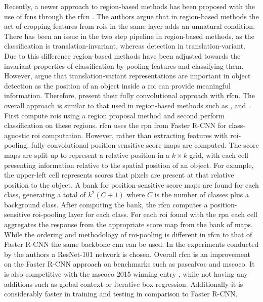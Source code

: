 \documentclass[a4paper,twoside]{article}
\begin{document}
Recently, a newer approach to region-based methods has been proposed with the use of \glspl{fcn} through the \gls{rfcn} \cite{rfcn}. The authors argue that in region-based methods the act of cropping features from \glspl{roi} in the same layer adds an unnatural condition. There has been an issue in the two step pipeline in region-based methods, as the classification is translation-invariant, whereas detection in translation-variant. Due to this difference region-based methods have been adjusted towards the invariant properties of classification by pooling features and classifying them. However, \cite{rfcn} argue that translation-variant representations are important in object detection as the position of an object inside a \gls{roi} can provide meaningful information. Therefore, \cite{rfcn} present their fully convolutional approach with \gls{rfcn}. The overall approach is similar to that used in region-based methods such as \cite{rcnn}, \cite{fastrcnn} and \cite{fasterrcnn}. First compute \glspl{roi} using a region proposal method and second perform classification on these regions. \gls{rfcn} uses the \gls{rpn} from Faster R-CNN \cite{fasterrcnn} for class-agnostic \gls{roi} computation. However, rather than extracting features with \gls{roi}-pooling, fully convolutional position-sensitive score maps are computed. The score maps are split up to represent a relative position in a $k\times k$ grid, with each cell presenting information relative to the spatial position of an object. For example, the upper-left cell represents scores that pixels are present at that relative position to the object. A bank for position-sensitive score maps are found for each class, generating a total of $k^2(C+1)$ where $C$ is the number of classes plus a background class. After computing the bank, the \gls{rfcn} computes a position-sensitive \gls{roi}-pooling layer for each class. For each \gls{roi} found with the \gls{rpn} each cell aggregates the response from the appropriate score map from the bank of maps. While the ordering and methodology of \gls{roi}-pooling is different in \gls{rfcn} to that of Faster R-CNN the same backbone \gls{cnn} can be used. In the experiments conducted by the authors a ResNet-101 network is chosen. Overall \gls{rfcn} is an improvement on the Faster R-CNN approach on benchmarks such as \gls{pascalvoc} and \gls{mscoco}. It is also competitive with the \gls{mscoco} 2015 winning entry \cite{deepres}, while not having any additions such as global context or iterative box regression. Additionally it is considerably faster in training and testing in comparison to Faster R-CNN. 
\end{document}
